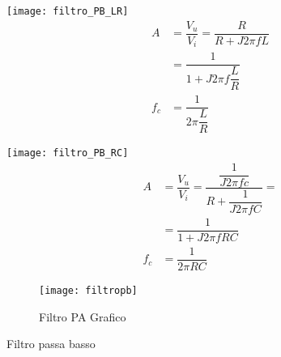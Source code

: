 \begin{table}[htbp]
\centering
\begin{minipage}{0.5\textwidth}
      \centering
     \texttt{[image: filtro\_PB\_LR]}
\centering
 \begin{align*}
A&=\dfrac{V_{u}}{V_{i}}
=\dfrac{R}{R+J2\pi fL}\\
&=\dfrac{1}{1+J2\pi f\dfrac{L}{R}}\\
f_{c}&=\dfrac{1}{2\pi \dfrac{L}{R}}
        \end{align*} 
 \end{minipage}\hfill
  \begin{minipage}{0.4\textwidth}
      \centering
\texttt{[image: filtro\_PB\_RC]}
  \centering
\begin{align*}
A&=\dfrac{V_{u}}{V_{i}}
=\dfrac{\dfrac{1}{J2\pi fc}}{R+\dfrac{1}{J2\pi fC}}=\\
&=\dfrac{1}{1+J2\pi fRC}\\
f_{c}&=\dfrac{1}{2\pi RC}
        \end{align*}
     \end{minipage}
  \begin{subfigure}[b]{.5\linewidth}
  	\centering\texttt{[image: filtropb]}
  	\caption{Filtro PA Grafico}
  \end{subfigure}
\caption{Filtro passa basso}
\label{tab:filtropassabasso}
\end{table}




